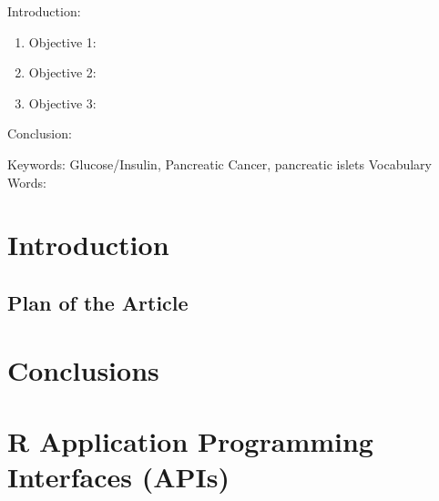 

\twocolumn
\scriptsize
\begin{frontmatter}
		\title{}
		\author{}
		\address{The Mathematical Learning Space}
\end{frontmatter}	

Introduction:
\begin{enumerate}
\item Objective 1:
\item Objective 2:
\item Objective 3:
\end{enumerate}
Conclusion:

Keywords:  Glucose/Insulin, Pancreatic Cancer, pancreatic islets
Vocabulary Words:

\section{Introduction}

\subsection{Plan of the Article}


\section{Conclusions}


\section{R Application Programming Interfaces (APIs)}





